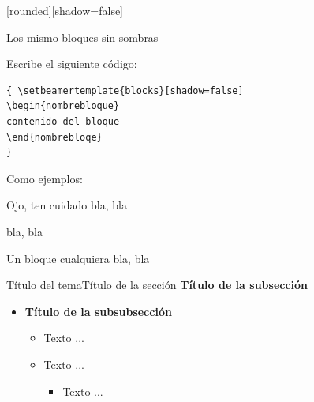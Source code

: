 \documentclass[10pt, envcountsect, presentation, aspectratio=43]{beamer}
\begin{document}
{[rounded][shadow=false]

\begin{frame}[fragile]{Los mismo bloques sin sombras}

Escribe el siguiente código:

\hfil{\tiny
\begin{verbatim}
{ \setbeamertemplate{blocks}[shadow=false]
\begin{nombrebloque}
contenido del bloque
\end{nombrebloqe}
}
\end{verbatim}
}

Como ejemplos:

\hfil\begin{minipage}{.5\textwidth}
\begin{alertblock}{\faEye \/ Ojo, ten cuidado}
	bla, bla
\end{alertblock}
	
\begin{example}[Un ejemplo]
	bla, bla
\end{example}

\begin{block}{\faInfoCircle\/ Un bloque cualquiera}
    bla, bla
\end{block}
\end{minipage}

	
\end{frame}
}






\begin{frame}{Título del tema}{Título de la sección}
	\textbf{Título de la subsección}
	\begin{itemize}
	\item \textbf{Título de la subsubsección}
		\begin{itemize}
		\normalsize %
		\item[--] Texto ...
		\item[--] Texto ...
			\begin{itemize}
			\normalsize %
			\item[$\bullet$] Texto ...
			\end{itemize}
		\end{itemize} 
	\end{itemize}
\end{frame}
\end{document}
